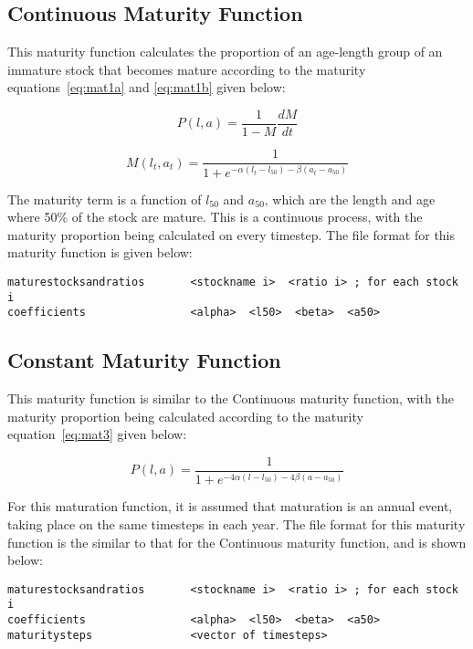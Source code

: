 \documentclass [a4paper, 10pt]{book}
\begin{document}
\subsection{Continuous Maturity Function}
This maturity function calculates the proportion of an age-length group of an immature stock that becomes mature according to the maturity equations~\ref{eq:mat1a} and \ref{eq:mat1b} given below:

\begin{equation}\label{eq:mat1a}
P(l, a) = {\frac{1}{1 - M}}{\frac{dM}{dt}}
\end{equation}

\begin{equation}\label{eq:mat1b}
M(l_{t},a_{t}) = \frac{1}{1 + e^{-\alpha(l_{t} - l_{50}) - \beta(a_{t} - a_{50})}}
\end{equation}

\bigskip
The maturity term is a function of $l_{50}$ and $a_{50}$, which are the length and age where 50\% of the stock are mature.  This is a continuous process, with the maturity proportion being calculated on every timestep.  The file format for this maturity function is given below:

{\small\begin{verbatim}
maturestocksandratios       <stockname i>  <ratio i> ; for each stock i
coefficients                <alpha>  <l50>  <beta>  <a50>
\end{verbatim}}

\subsection{Constant Maturity Function}
This maturity function is similar to the Continuous maturity function, with the maturity proportion being calculated according to the maturity equation~\ref{eq:mat3} given below:

\begin{equation}\label{eq:mat3}
P(l, a) = \frac{1}{ 1 + e^{-4\alpha(l - l_{50}) -4\beta(a - a_{50})}}
\end{equation}

For this maturation function, it is assumed that maturation is an annual event, taking place on the same timesteps in each year.  The file format for this maturity function is the similar to that for the Continuous maturity function, and is shown below:

{\small\begin{verbatim}
maturestocksandratios       <stockname i>  <ratio i> ; for each stock i
coefficients                <alpha>  <l50>  <beta>  <a50>
maturitysteps               <vector of timesteps>
\end{verbatim}}
\end{document}
